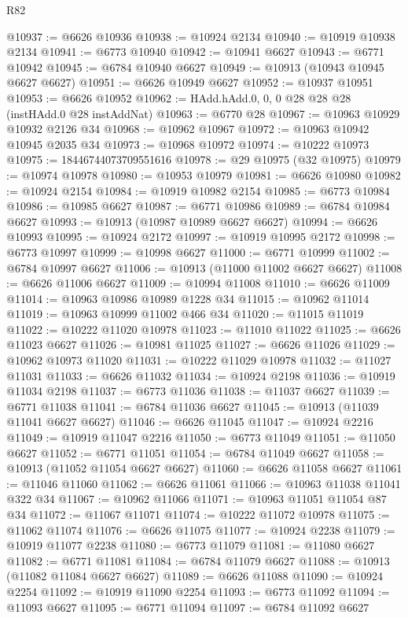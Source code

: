 \begin{lexlean}{R82}
\begin{coremodule}
@10937 := @6626 @10936
@10938 := @10924 @2134
@10940 := @10919 @10938 @2134
@10941 := @6773 @10940
@10942 := @10941 @6627
@10943 := @6771 @10942
@10945 := @6784 @10940 @6627
@10949 := @10913 (@10943 @10945 @6627 @6627)
@10951 := @6626 @10949 @6627
@10952 := @10937 @10951
@10953 := @6626 @10952
@10962 := HAdd.hAdd.{0, 0, 0} @28 @28 @28 (instHAdd.{0} @28 instAddNat)
@10963 := @6770 @28
@10967 := @10963 @10929 @10932 @2126 @34
@10968 := @10962 @10967
@10972 := @10963 @10942 @10945 @2035 @34
@10973 := @10968 @10972
@10974 := @10222 @10973
@10975 := 18446744073709551616
@10978 := @29 @10975 (@32 @10975)
@10979 := @10974 @10978
@10980 := @10953 @10979
@10981 := @6626 @10980
@10982 := @10924 @2154
@10984 := @10919 @10982 @2154
@10985 := @6773 @10984
@10986 := @10985 @6627
@10987 := @6771 @10986
@10989 := @6784 @10984 @6627
@10993 := @10913 (@10987 @10989 @6627 @6627)
@10994 := @6626 @10993
@10995 := @10924 @2172
@10997 := @10919 @10995 @2172
@10998 := @6773 @10997
@10999 := @10998 @6627
@11000 := @6771 @10999
@11002 := @6784 @10997 @6627
@11006 := @10913 (@11000 @11002 @6627 @6627)
@11008 := @6626 @11006 @6627
@11009 := @10994 @11008
@11010 := @6626 @11009
@11014 := @10963 @10986 @10989 @1228 @34
@11015 := @10962 @11014
@11019 := @10963 @10999 @11002 @466 @34
@11020 := @11015 @11019
@11022 := @10222 @11020 @10978
@11023 := @11010 @11022
@11025 := @6626 @11023 @6627
@11026 := @10981 @11025
@11027 := @6626 @11026
@11029 := @10962 @10973 @11020
@11031 := @10222 @11029 @10978
@11032 := @11027 @11031
@11033 := @6626 @11032
@11034 := @10924 @2198
@11036 := @10919 @11034 @2198
@11037 := @6773 @11036
@11038 := @11037 @6627
@11039 := @6771 @11038
@11041 := @6784 @11036 @6627
@11045 := @10913 (@11039 @11041 @6627 @6627)
@11046 := @6626 @11045
@11047 := @10924 @2216
@11049 := @10919 @11047 @2216
@11050 := @6773 @11049
@11051 := @11050 @6627
@11052 := @6771 @11051
@11054 := @6784 @11049 @6627
@11058 := @10913 (@11052 @11054 @6627 @6627)
@11060 := @6626 @11058 @6627
@11061 := @11046 @11060
@11062 := @6626 @11061
@11066 := @10963 @11038 @11041 @322 @34
@11067 := @10962 @11066
@11071 := @10963 @11051 @11054 @87 @34
@11072 := @11067 @11071
@11074 := @10222 @11072 @10978
@11075 := @11062 @11074
@11076 := @6626 @11075
@11077 := @10924 @2238
@11079 := @10919 @11077 @2238
@11080 := @6773 @11079
@11081 := @11080 @6627
@11082 := @6771 @11081
@11084 := @6784 @11079 @6627
@11088 := @10913 (@11082 @11084 @6627 @6627)
@11089 := @6626 @11088
@11090 := @10924 @2254
@11092 := @10919 @11090 @2254
@11093 := @6773 @11092
@11094 := @11093 @6627
@11095 := @6771 @11094
@11097 := @6784 @11092 @6627

\end{coremodule}
\end{lexlean}
